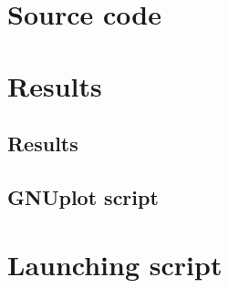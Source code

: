 \chapter{Source code}



\chapter{Results}

\section{Results}


\section{GNUplot script}
\lstset{language=Gnuplot}


\chapter{Launching script}

\lstset{language=Ruby}

